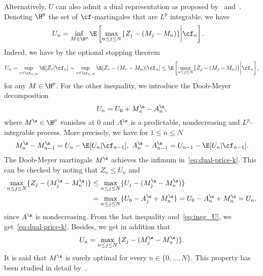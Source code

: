 Alternatively, $U$ can also admit a dual representation as proposed by~\cite{rogers-02,rogers-10} and~\cite{HK}. Denoting $\H^p$ the set of $\cf$-martingales that are $L^p$ integrable, we have 
\begin{align}
  \label{eq:dual-price-k}
  U_{n} & = \inf_{M \in \H^p} \E\left[ \max_{n \le j \le N} \{Z_{j} - (M_{j}- M_{n})\}\bigg| \cf_{n}\right].
\end{align}
Indeed, we have by the optional stopping theorem
\begin{equation}\label{eq:ineg_U} U_{n} = \sup_{\tau \in \ct_{n, N}} \E[ Z_{\tau} | \cf_{n}]= \sup_{\tau \in \ct_{n, N}} \E[ Z_{\tau}- (M_{\tau}- M_{n}) | \cf_{n}]\le \E\left[ \max_{n \le j \le N} \{Z_{j} - (M_{j}- M_{n})\}\bigg| \cf_{n}\right], \end{equation}
for any $M\in \H^p$. For the other inequality, we introduce the Doob-Meyer decomposition
\begin{equation}
  \label{eq:doob-meyer}
  U_{n} = U_0 + M^\s_{n} - A^\s_{n},
\end{equation}
where $M^\s\in \H^p$ vanishes at $0$ and $A^\s$ is a predictable, nondecreasing and $L^p$-integrable process. More precisely, 
we have for $ 1 \le n \le N$
\begin{equation}\label{decompo_DM}
  M^\s_{n}-M^\s_{n-1}=U_{n}-\E[U_{n}|\cf_{n-1}], \  A^\s_{n}-A^\s_{n-1}=U_{n-1}-\E[U_{n}|\cf_{n-1}].
\end{equation}
The Doob-Meyer martingale $M^\s$ achieves the infimum in~\eqref{eq:dual-price-k}. This can be checked by noting that $Z_n\le U_n$ and 
\begin{align*}
  \max_{n \le j \le N} \{Z_{j} - (M^\s_{j}- M^\s_{n}) \}&\le \max_{n \le j \le N} \{U_{j} - (M^\s_{j}- M^\s_{n}) \} \\&= \max_{n \le j \le N} \{U_0-A^\s_j+ M^\s_{n} \}= U_0-A^\s_n+ M^\s_{n}=U_n,
\end{align*}
since $A^\s$ is nondecreasing. 
From the last inequality and~\eqref{eq:ineg_U}, we get~\eqref{eq:dual-price-k}. Besides, we get in addition that
\begin{equation}\label{eq:almost_sure_Mstar} U_n= \max_{n \le j \le N} \{Z_{j} - (M^\s_{j}- M^\s_{n}) \}.
\end{equation}
It is said that $M^\s$ is surely optimal for every $n \in \{0,\dots,N\}$. This property has been studied in detail by~\cite{schoen12-1}.   

